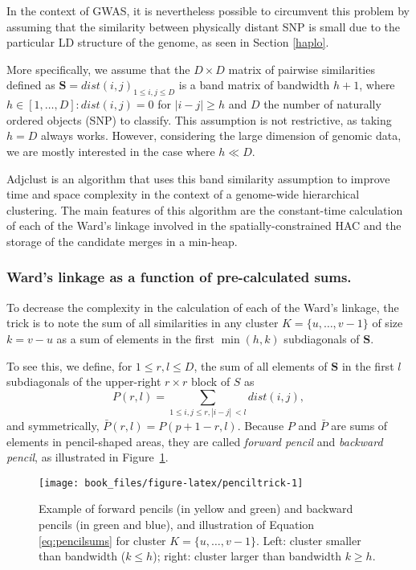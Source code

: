 \documentclass[]{book}
\begin{document}
In the context of GWAS, it is nevertheless possible to circumvent this
problem by assuming that the similarity between physically distant SNP
is small due to the particular LD structure of the genome, as seen in
Section \ref{haplo}.

More specifically, we assume that the \(D\times D\) matrix of pairwise
similarities defined as \(\mathbf{S} = dist(i,j)_{1 \leq i,j\leq D}\) is a band
matrix of bandwidth \(h + 1\), where \(h \in [1,\dots,D]: dist(i,j) = 0\)
for \(|i-j| \geq h\) and \(D\) the number of naturally ordered objects (SNP)
to classify. This assumption is not restrictive, as taking \(h = D\)
always works. However, considering the large dimension of genomic data,
we are mostly interested in the case where \(h \ll D\).

Adjclust is an algorithm that uses this band similarity assumption to
improve time and space complexity in the context of a genome-wide
hierarchical clustering. The main features of this algorithm are the
constant-time calculation of each of the Ward's linkage involved in the
spatially-constrained HAC and the storage of the candidate merges in a
min-heap.

\hypertarget{wards-linkage-as-a-function-of-pre-calculated-sums.}{%
\subsubsection{Ward's linkage as a function of pre-calculated sums.}\label{wards-linkage-as-a-function-of-pre-calculated-sums.}}

To decrease the complexity in the calculation of each of the Ward's
linkage, the trick is to note the sum of all similarities in any cluster
\(K=\{u, \dots , v-1\}\) of size \(k = v-u\) as a sum of elements in the
first \(\min(h,k)\) subdiagonals of \(\mathbf{S}\).

To see this, we define, for \(1 \leq r,l \leq D\), the sum of all elements
of \(\mathbf{S}\) in the first \(l\) subdiagonals of the upper-right \(r \times r\)
block of \(S\) as
\[P(r,l) = \sum_{1 \leq i,j \leq r, |i-j| \ < l} dist(i,j) ,\] and
symmetrically, \(\bar{P}(r, l) = P(p+1-r, l)\). Because \(P\) and \(\bar{P}\)
are sums of elements in pencil-shaped areas, they are called \emph{forward pencil} and \emph{backward pencil}, as illustrated in Figure~\ref{fig:penciltrick}.



\begin{figure}

{\centering \texttt{[image: book\_files/figure-latex/penciltrick-1]} 

}

\caption{Example of forward pencils (in yellow and green) and backward pencils (in green and blue), and illustration of Equation \eqref{eq:pencilsums} for cluster \(K=\{u, \dots , v-1\}\). Left: cluster smaller than bandwidth (\(k \leq h\)); right: cluster larger than bandwidth \(k \geq h\).}\label{fig:penciltrick}
\end{figure}
\end{document}
